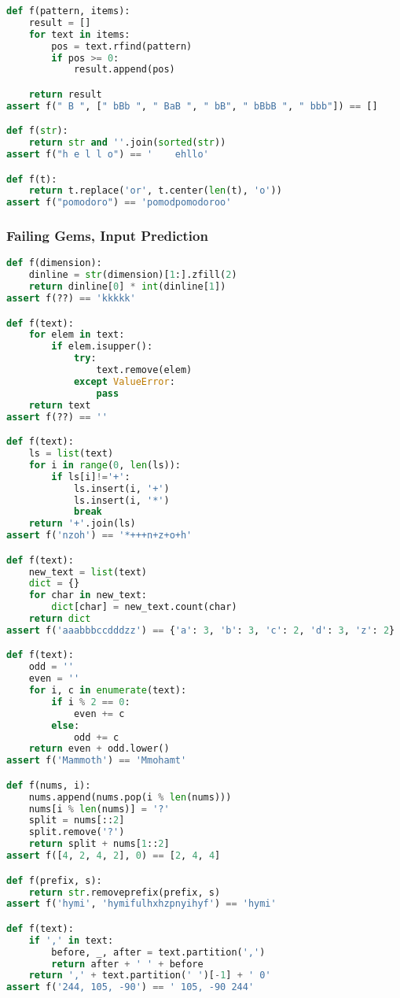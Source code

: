 \begin{lstlisting}[breaklines=true, language=python]
def f(pattern, items):
    result = []
    for text in items:
        pos = text.rfind(pattern)
        if pos >= 0:
            result.append(pos)

    return result
assert f(" B ", [" bBb ", " BaB ", " bB", " bBbB ", " bbb"]) == []

def f(str):
    return str and ''.join(sorted(str))
assert f("h e l l o") == '    ehllo'

def f(t):
    return t.replace('or', t.center(len(t), 'o'))
assert f("pomodoro") == 'pomodpomodoroo'
\end{lstlisting}

\subsubsection{Failing Gems, Input Prediction}
\begin{lstlisting}[breaklines=true, language=python]
def f(dimension):
    dinline = str(dimension)[1:].zfill(2)
    return dinline[0] * int(dinline[1])
assert f(??) == 'kkkkk'

def f(text):
    for elem in text:
        if elem.isupper():
            try:
                text.remove(elem)
            except ValueError:
                pass
    return text
assert f(??) == ''

def f(text):
    ls = list(text)
    for i in range(0, len(ls)):
        if ls[i]!='+':
            ls.insert(i, '+')
            ls.insert(i, '*')
            break
    return '+'.join(ls)
assert f('nzoh') == '*+++n+z+o+h'

def f(text):
    new_text = list(text)
    dict = {}
    for char in new_text:
        dict[char] = new_text.count(char)
    return dict
assert f('aaabbbccdddzz') == {'a': 3, 'b': 3, 'c': 2, 'd': 3, 'z': 2}

def f(text):
    odd = ''
    even = ''
    for i, c in enumerate(text):
        if i % 2 == 0:
            even += c
        else:
            odd += c
    return even + odd.lower()
assert f('Mammoth') == 'Mmohamt'

def f(nums, i):
    nums.append(nums.pop(i % len(nums)))
    nums[i % len(nums)] = '?'
    split = nums[::2]
    split.remove('?')
    return split + nums[1::2]
assert f([4, 2, 4, 2], 0) == [2, 4, 4]

def f(prefix, s):
    return str.removeprefix(prefix, s)
assert f('hymi', 'hymifulhxhzpnyihyf') == 'hymi'

def f(text):
    if ',' in text:
        before, _, after = text.partition(',')
        return after + ' ' + before
    return ',' + text.partition(' ')[-1] + ' 0'
assert f('244, 105, -90') == ' 105, -90 244'


\end{lstlisting}
